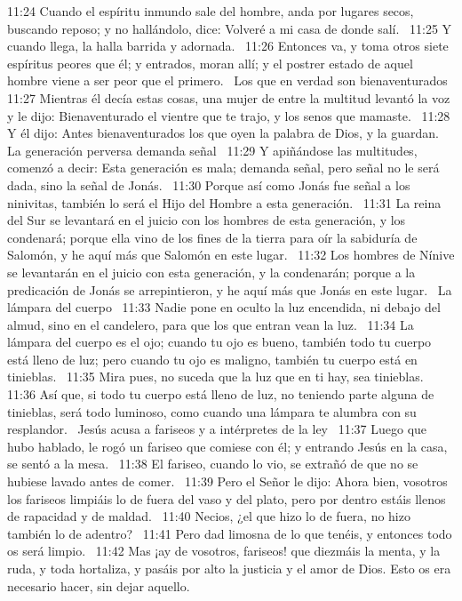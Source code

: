 11:24 Cuando el espíritu inmundo sale del hombre, anda por lugares secos, buscando reposo; y no hallándolo, dice: Volveré a mi casa de donde salí.  
11:25 Y cuando llega, la halla barrida y adornada.  
11:26 Entonces va, y toma otros siete espíritus peores que él; y entrados, moran allí; y el postrer estado de aquel hombre viene a ser peor que el primero.  
Los que en verdad son bienaventurados  
11:27 Mientras él decía estas cosas, una mujer de entre la multitud levantó la voz y le dijo: Bienaventurado el vientre que te trajo, y los senos que mamaste.  
11:28 Y él dijo: Antes bienaventurados los que oyen la palabra de Dios, y la guardan.  
La generación perversa demanda señal   
11:29 Y apiñándose las multitudes, comenzó a decir: Esta generación es mala; demanda señal, pero señal no le será dada, sino la señal de Jonás.  
11:30 Porque así como Jonás fue señal a los ninivitas, también lo será el Hijo del Hombre a esta generación.  
11:31 La reina del Sur se levantará en el juicio con los hombres de esta generación, y los condenará; porque ella vino de los fines de la tierra para oír la sabiduría de Salomón, y he aquí más que Salomón en este lugar.  
11:32 Los hombres de Nínive se levantarán en el juicio con esta generación, y la condenarán; porque a la predicación de Jonás se arrepintieron, y he aquí más que Jonás en este lugar.  
La lámpara del cuerpo   
11:33 Nadie pone en oculto la luz encendida, ni debajo del almud, sino en el candelero, para que los que entran vean la luz.  
11:34 La lámpara del cuerpo es el ojo; cuando tu ojo es bueno, también todo tu cuerpo está lleno de luz; pero cuando tu ojo es maligno, también tu cuerpo está en tinieblas.  
11:35 Mira pues, no suceda que la luz que en ti hay, sea tinieblas.  
11:36 Así que, si todo tu cuerpo está lleno de luz, no teniendo parte alguna de tinieblas, será todo luminoso, como cuando una lámpara te alumbra con su resplandor.  
Jesús acusa a fariseos y a intérpretes de la ley  
11:37 Luego que hubo hablado, le rogó un fariseo que comiese con él; y entrando Jesús en la casa, se sentó a la mesa.  
11:38 El fariseo, cuando lo vio, se extrañó de que no se hubiese lavado antes de comer.  
11:39 Pero el Señor le dijo: Ahora bien, vosotros los fariseos limpiáis lo de fuera del vaso y del plato, pero por dentro estáis llenos de rapacidad y de maldad.  
11:40 Necios, ¿el que hizo lo de fuera, no hizo también lo de adentro?  
11:41 Pero dad limosna de lo que tenéis, y entonces todo os será limpio.  
11:42 Mas ¡ay de vosotros, fariseos! que diezmáis la menta, y la ruda, y toda hortaliza, y pasáis por alto la justicia y el amor de Dios. Esto os era necesario hacer, sin dejar aquello.  
